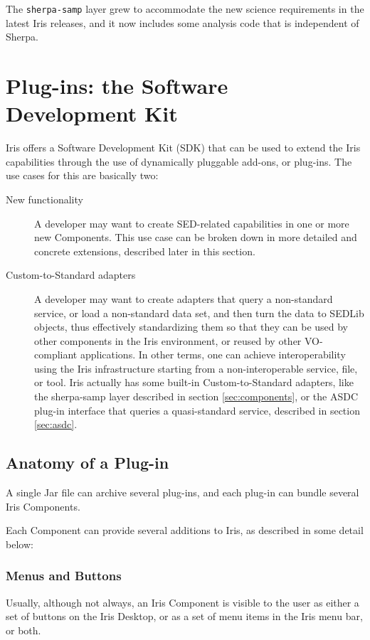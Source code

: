\documentclass[5p]{elsarticle}
\begin{document}
The \verb|sherpa-samp| layer grew to accommodate the new science requirements in the latest Iris releases, and it now includes some analysis code that is independent of Sherpa.

\section{Plug-ins: the Software Development Kit}
\label{sec:plugins}

Iris offers a Software Development Kit (SDK) that can be used to extend the Iris capabilities through the use of dynamically pluggable add-ons, or plug-ins.
The use cases for this are basically two:
\begin{description}
\item[New functionality] A developer may want to create SED-related capabilities in one or more new Components. This use case can be broken down in more detailed and concrete extensions, described later in this section.
\item[Custom-to-Standard adapters] A developer may want to create adapters that query a non-standard service, or load a non-standard data set, and then turn the data to SEDLib objects, thus effectively standardizing them so that they can be used by other components in the Iris environment, or reused by other VO-compliant applications. In other terms, one can achieve interoperability using the Iris infrastructure starting from a non-interoperable service, file, or tool. Iris actually has some built-in Custom-to-Standard adapters, like the sherpa-samp layer described in section \ref{sec:components}, or the ASDC plug-in interface that queries a quasi-standard service, described in section \ref{sec:asdc}.
\end{description}

\subsection{Anatomy of a Plug-in}
A single Jar file can archive several plug-ins, and each plug-in can bundle several Iris Components.

Each Component can provide several additions to Iris, as described in some detail below:

\subsubsection{Menus and Buttons}
Usually, although not always, an Iris Component is visible to the user as either a set of buttons on the Iris Desktop, or as a set of menu items in the Iris menu bar, or both.
\end{document}
